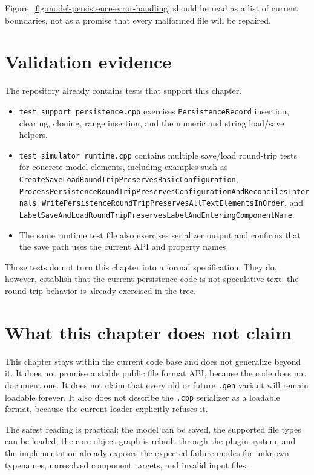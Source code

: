 Figure~\ref{fig:model-persistence-error-handling} should be read as a list of
current boundaries, not as a promise that every malformed file will be repaired.

\section{Validation evidence}
\label{sec:model-persistence-validation}

The repository already contains tests that support this chapter.
\begin{itemize}
\item \texttt{test\_support\_persistence.cpp} exercises
      \texttt{PersistenceRecord} insertion, clearing, cloning, range insertion,
      and the numeric and string load/save helpers.
\item \texttt{test\_simulator\_runtime.cpp} contains multiple save/load
      round-trip tests for concrete model elements, including examples such as
      \texttt{CreateSaveLoadRoundTripPreservesBasicConfiguration},
      \texttt{ProcessPersistenceRoundTripPreservesConfigurationAndReconcilesInternals},
      \texttt{WritePersistenceRoundTripPreservesAllTextElementsInOrder}, and
      \texttt{LabelSaveAndLoadRoundTripPreservesLabelAndEnteringComponentName}.
\item The same runtime test file also exercises serializer output and confirms
      that the save path uses the current API and property names.
\end{itemize}

Those tests do not turn this chapter into a formal specification. They do,
however, establish that the current persistence code is not speculative text:
the round-trip behavior is already exercised in the tree.

\section{What this chapter does not claim}
\label{sec:model-persistence-limits}

This chapter stays within the current code base and does not generalize beyond
it. It does not promise a stable public file format ABI, because the code does
not document one. It does not claim that every old or future \texttt{.gen}
variant will remain loadable forever. It also does not describe the \texttt{.cpp}
serializer as a loadable format, because the current loader explicitly refuses
it.

The safest reading is practical: the model can be saved, the supported file
types can be loaded, the core object graph is rebuilt through the plugin
system, and the implementation already exposes the expected failure modes for
unknown typenames, unresolved component targets, and invalid input files.

